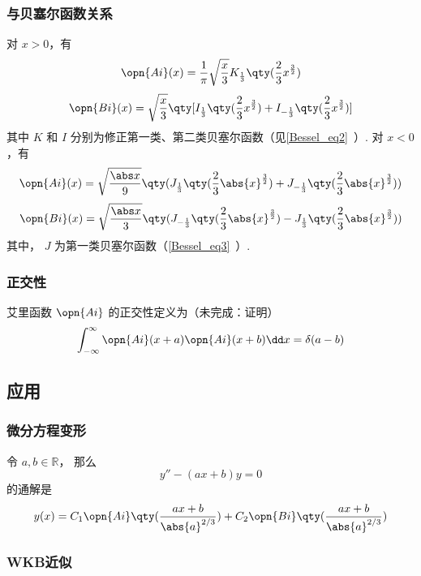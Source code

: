 \subsubsection{与贝塞尔函数关系}
对 $x>0$，有
\begin{equation}
\opn{Ai}(x)=\frac1\pi \sqrt{\frac x3} K_{\frac13} \qty(\frac23 x^{\frac32})
\end{equation}\begin{equation}
\opn{Bi}(x)=\sqrt{\frac x3}\qty[I_{\frac13}\qty(\frac23 x^{\frac32})+I_{-\frac13}\qty(\frac23 x^{\frac32})]
\end{equation}
其中 $K$ 和 $I$ 分别为修正第一类、第二类贝塞尔函数（见\autoref{Bessel_eq2}~）.
对 $x<0$，有
\begin{equation}
\opn{Ai}(x)=\sqrt{\frac{\abs x}{9}}\qty(J_{\frac13}\qty(\frac23 \abs{x}^{\frac32})+J_{-\frac13}\qty(\frac23 \abs{x}^{\frac32}))
\end{equation}
\begin{equation}
\opn{Bi}(x)=\sqrt{\frac{\abs x}{3}}\qty(J_{-\frac13}\qty(\frac23 \abs{x}^{\frac32})-J_{\frac13}\qty(\frac23 \abs{x}^{\frac32}))
\end{equation}
其中， $J$ 为第一类贝塞尔函数（\autoref{Bessel_eq3}~）.
\subsubsection{正交性}
艾里函数 $\opn{Ai}$ 的正交性定义为（未完成：证明）
\begin{equation}
\int_{-\infty}^\infty\opn{Ai}(x+a)\opn{Ai}(x+b)\dd x=\delta(a-b)
\end{equation}
\subsection{应用}
\subsubsection{微分方程变形}
令 $a, b\in \mathbb R$， 那么
\begin{equation}
y'' - (ax + b) y = 0
\end{equation}
的通解是
\begin{equation}\label{AiryF_eq1}
y(x) = C_1\opn{Ai}\qty(\frac{ax+b}{\abs{a}^{2/3}}) + C_2 \opn{Bi}\qty(\frac{ax+b}{\abs{a}^{2/3}})
\end{equation}
\subsubsection{WKB近似}

